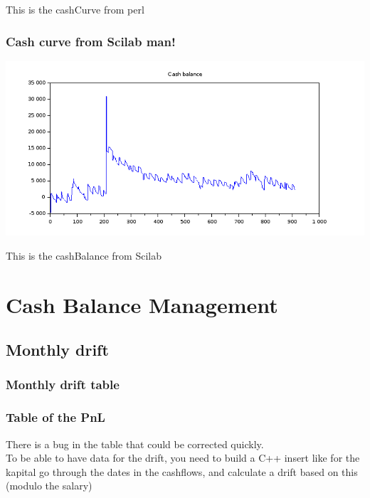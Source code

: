 \documentclass[8pt]{article} %
\begin{document}
This is the cashCurve from perl\\

\subsubsection{Cash curve from Scilab man!}
\includegraphics[scale=0.6]{Scilab-cashBalance.png}


This is the cashBalance from Scilab\\

\section{Cash Balance Management}

\subsection{Monthly drift}

\subsubsection{Monthly drift table}
%



\subsubsection{Table of the PnL}


There is a bug in the table that could be corrected quickly.\\
To be able to have data for the drift, you need to build a C++ insert like for the kapital
go through the dates in the cashflows, and calculate a drift based on this (modulo the salary) 
\end{document}
